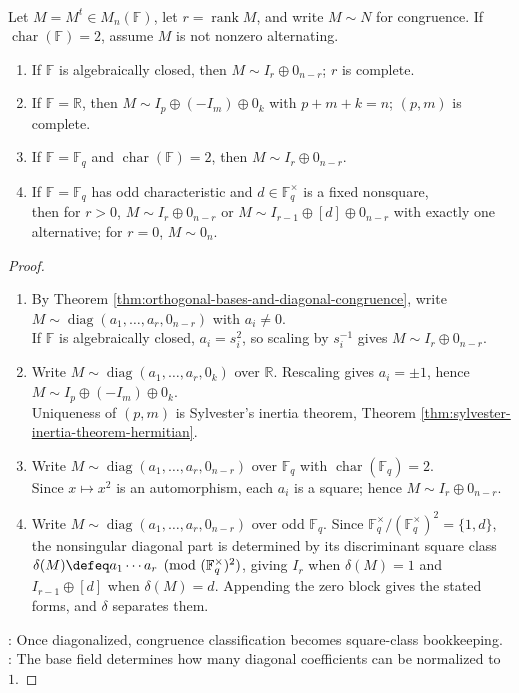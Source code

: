 \begin{theorem} \label{thm:orthogonal-canonical-forms-common-fields} \\
Let $M=M^t\in M_n(\mathbb{F})$, let $r=\operatorname{rank}M$, and write $M\sim N$ for congruence. If $\operatorname{char}(\mathbb{F})=2$, assume $M$ is not nonzero alternating.
\begin{enumerate}[label=(\roman*)]
\setlength{\itemsep}{0pt}
\item If $\mathbb{F}$ is algebraically closed, then $M\sim I_r\oplus0_{n-r}$; $r$ is complete.
\item If $\mathbb{F}=\mathbb{R}$, then $M\sim I_p\oplus(-I_m)\oplus0_k$ with $p+m+k=n$; $(p,m)$ is complete.
\item If $\mathbb{F}=\mathbb{F}_q$ and $\operatorname{char}(\mathbb{F})=2$, then $M\sim I_r\oplus0_{n-r}$.
\item If $\mathbb{F}=\mathbb{F}_q$ has odd characteristic and $d\in\mathbb{F}_q^{\times}$ is a fixed nonsquare,\\
then for $r>0$, $M\sim I_r\oplus0_{n-r}$ or $M\sim I_{r-1}\oplus[d]\oplus0_{n-r}$ with exactly one alternative; for $r=0$, $M\sim0_n$.
\end{enumerate}
\begin{proof}
\begin{enumerate}[label=(\roman*)]
\setlength{\itemsep}{0pt}
\item By Theorem \ref{thm:orthogonal-bases-and-diagonal-congruence}, write $M\sim\operatorname{diag}(a_1,\ldots,a_r,0_{n-r})$ with $a_i\neq0$.\\
If $\mathbb{F}$ is algebraically closed, $a_i=s_i^2$, so scaling by $s_i^{-1}$ gives $M\sim I_r\oplus0_{n-r}$.
\item Write $M\sim\operatorname{diag}(a_1,\ldots,a_r,0_k)$ over $\mathbb{R}$. Rescaling gives $a_i=\pm1$, hence $M\sim I_p\oplus(-I_m)\oplus0_k$.\\
Uniqueness of $(p,m)$ is Sylvester's inertia theorem, Theorem \ref{thm:sylvester-inertia-theorem-hermitian}.
\item Write $M\sim\operatorname{diag}(a_1,\ldots,a_r,0_{n-r})$ over $\mathbb{F}_q$ with $\operatorname{char}(\mathbb{F}_q)=2$.\\
Since $x\mapsto x^2$ is an automorphism, each $a_i$ is a square; hence $M\sim I_r\oplus0_{n-r}$.
\item Write $M\sim\operatorname{diag}(a_1,\ldots,a_r,0_{n-r})$ over odd $\mathbb{F}_q$. Since $\mathbb{F}_q^{\times}/(\mathbb{F}_q^{\times})^2=\{1,d\}$, the nonsingular diagonal part is determined by its discriminant square class $\delta(M)\defeq a_1\cdots a_r\pmod{(\mathbb{F}_q^{\times})^2}$, giving $I_r$ when $\delta(M)=1$ and $I_{r-1}\oplus[d]$ when $\delta(M)=d$. Appending the zero block gives the stated forms, and $\delta$ separates them.
\end{enumerate}
: Once diagonalized, congruence classification becomes square-class bookkeeping.\\
: The base field determines how many diagonal coefficients can be normalized to $1$.
\end{proof}
\end{theorem}

